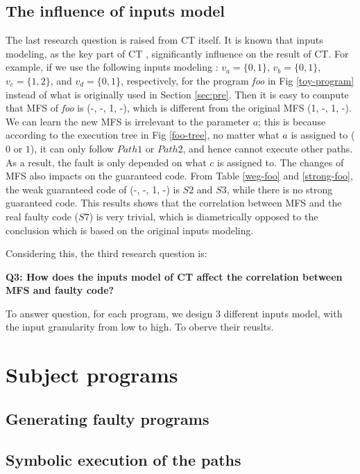 \documentclass{sig-alternate-05-2015}
\begin{document}
\subsection{The influence of inputs model}
The last research question is raised from CT itself. It is known that inputs modeling, as the key part of CT \cite{nie2011survey}, significantly influence on the result of CT. For example, if we use the following inputs modeling : $v_{a} = \{ 0, 1 \}$, $v_{b} = \{ 0, 1\}$, $v_{c} = \{ 1, 2\}$, and $v_{d} = \{ 0, 1\}$, respectively, for the program \emph{foo} in Fig \ref{toy-program} instead of what is originally used in Section \ref{sec:pre}. Then it is easy to compute that MFS of \emph{foo} is (-, -, 1, -), which is different from the original MFS (1, -, 1, -). We can learn the new MFS is irrelevant to the parameter $a$; this is because according to the execution tree in Fig \ref{foo-tree}, no matter what $a$ is assigned to ($0$ or $1$), it can only follow $Path 1$ or $Path 2$, and hence cannot execute other paths. As a result, the fault is only depended on what $c$ is assigned to. The changes of MFS also impacts on the guaranteed code. From Table \ref{weg-foo} and \ref{strong-foo}, the weak guaranteed code of (-, -, 1, -) is $S2$ and $S3$, while there is no strong guaranteed code. This results shows that the correlation between MFS and the real faulty code ($S7$) is  very trivial, which is diametrically opposed to the conclusion which is based on the original inputs modeling.
  
Considering this, the third research question is:

\textbf{Q3: How does the inputs model of CT affect the correlation between MFS and faulty code?}


To answer question, for each program, we design 3 different inputs model, with the input granularity from low to high. To oberve their reuslts.



\section{Subject programs}\label{sec:subjects}

\subsection{Generating faulty programs}

\subsection{Symbolic execution of the paths}
\end{document}
